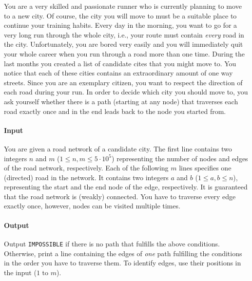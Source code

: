 




You are a very skilled and passionate runner who is currently planning to move to a new city. Of course, the city you will move to must be a suitable place to continue your training habits. 
Every day in the morning, you want to go for a very long run through the whole city, i.e., your route must contain \emph{every} road in the city. Unfortunately, you are bored very easily and you will immediately quit your whole career when you run through a road 
more than one time. During the last months you created a list of candidate cites that you might move to. You notice that each of these cities contains an extraordinary amount of one way streets. Since you are an exemplary citizen, you want to respect the direction 
of each road during your run. In order to decide which city you should move to, you ask yourself whether there is a path (starting at any node) that traverses each road exactly once and in the end leads back to the node you started from.

\paragraph*{Input} You are given a road network of a candidate city. The first line contains two integers $n$ and $m$ ($1 \le n, m \le 5\cdot10^5$) representing the number of nodes and edges of the road network, respectively.
Each of the following $m$ lines specifies one (directed) road in the network. It contains two integers $a$ and $b$ ($1 \le a, b \le n$), representing the start and the end node of the edge, respectively. It is guaranteed that the road network is (weakly) connected.
You have to traverse every edge exactly once, however, nodes can be visited multiple times.

\paragraph*{Output}

Output \texttt{IMPOSSIBLE} if there is no path that fulfills the above conditions. Otherwise, print a line containing the edges of \emph{one} path fulfilling the conditions in the order you have to traverse them. To identify edges, use their positions in the input ($1$ to $m$).

\begin{samples}
\end{samples}

